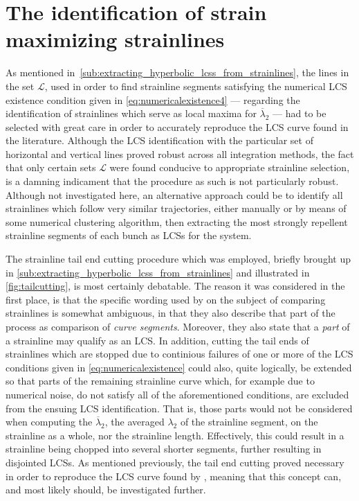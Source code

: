 \section{The identification of strain maximizing strainlines}
\label{sec:the_identification_of_strain_maximizing_strainlines}

As mentioned in~\cref{sub:extracting_hyperbolic_lcss_from_strainlines},
the lines in the set $\mathcal{L}$, used in order to find strainline segments
satisfying the numerical LCS existence condition given in
\cref{eq:numericalexistence4} --- regarding the identification of strainlines
which serve as local maxima for $\overline{\lambda}_{2}$ --- had to be selected
with great care in order to accurately reproduce the LCS curve found in the
literature. Although the LCS identification with the particular set of
horizontal and vertical lines proved robust across all integration methods, the
fact that only certain sets $\mathcal{L}$ were found conducive to appropriate
strainline selection, is a damning indicament that the procedure as such is not
particularly robust. Although not investigated here, an alternative approach
could be to identify all strainlines which follow very similar trajectories,
either manually or by means of some numerical clustering algorithm, then
extracting the most strongly repellent strainline segments of each bunch as
LCSs for the system.

The strainline tail end cutting procedure which was employed, briefly brought
up in
\cref{sub:extracting_hyperbolic_lcss_from_strainlines} and illustrated in
\cref{fig:tailcutting}, is most certainly debatable. The reason it was
considered in the first place, is that the specific wording used by
\textcite{farazmand2012computing} on the subject of comparing strainlines is
somewhat ambiguous, in that they also describe that part of the process as
comparison of \emph{curve segments}. Moreover, they also state that a
\emph{part} of a strainline may qualify as an LCS. In addition, cutting the
tail ends of strainlines which are stopped due to continious failures of one
or more of the LCS conditions given in
\cref{eq:numericalexistence} could also, quite logically, be extended so that
parts of the remaining strainline curve which, for example due to numerical
noise, do not satisfy all of the aforementioned conditions, are excluded from
the ensuing LCS identification. That is, those parts would not be considered
when computing the $\overline{\lambda}_{2}$, the averaged $\lambda_{2}$ of
the strainline segment, on the strainline as a whole, nor
the strainline length. Effectively, this could result in a strainline being
chopped into several shorter segments, further resulting in
disjointed LCSs. As mentioned previously, the tail end cutting proved necessary
in order to reproduce the LCS curve found by \textcite{farazmand2012computing},
meaning that this concept can, and most likely should, be investigated further.

